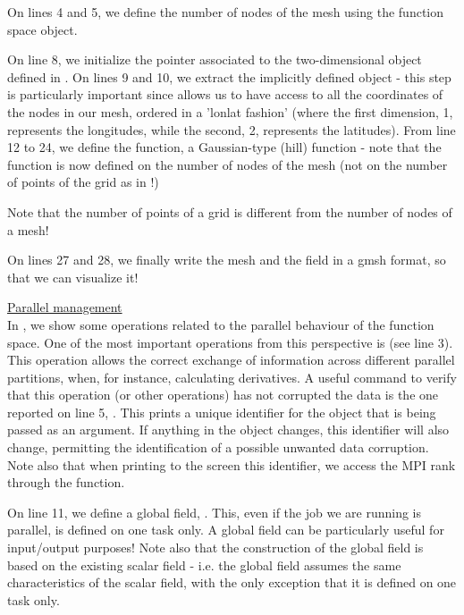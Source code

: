 \begin{description}
On lines 4 and 5, we define the number of nodes of the mesh using 
the  function space object.

On line 8, we initialize the pointer  associated
to the two-dimensional  object defined in 
.
On lines 9 and 10, we extract the implicitly defined  
object - this step is particularly important since allows us 
to have access to all the coordinates of the nodes in our mesh, 
ordered in a 'lonlat fashion' (where the first dimension, 1, 
represents the longitudes, while the second, 2, represents 
the latitudes).	From line 12 to 24, we define the function, 
a Gaussian-type (hill) function - note that the function 
is now defined on the number of nodes of the mesh (not on 
the number of points of the grid as in !)
%
\begin{warningbox}
Note that the number of points of a grid is different from 
the number of nodes of a mesh!
\end{warningbox}
%
On lines 27 and 28, we finally write the mesh and the field 
in a gmsh format, so that we can visualize it!
%

%
%
\item \underline{Parallel management}\\[0.5em]
%
In , we show some operations related to the 
parallel behaviour of the function space. One of the most important
operations from this perspective is  (see line 3). 
This operation allows the correct exchange of information across different 
parallel partitions, when, for instance, calculating derivatives.
A useful command to verify that this operation (or other operations) 
has not corrupted the data is the one reported on line 5, .
This prints a unique identifier for the object that is being passed 
as an argument. If anything in the object changes, this identifier 
will also change, permitting the identification of a possible unwanted 
data corruption. Note also that when printing to the screen this identifier,
we access the MPI rank through the  function.

On line 11, we define a global field, . 
This, even if the job we are running is parallel, is defined on one task 
only. A global field can be particularly useful for input/output purposes!
Note also that the construction of the global field is based on the existing 
scalar field - i.e. the global field assumes the same characteristics of 
the scalar field, with the only exception that it is defined on one task
only.


\end{description}
